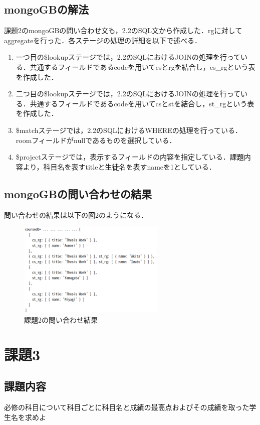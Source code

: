 \documentclass[dvipdfmx]{jarticle}
\begin{document}
\subsection{mongoGBの解法}
課題2のmongoGBの問い合わせ文も，2.2のSQL文から作成した．rgに対してaggregateを行った．各ステージの処理の詳細を以下で述べる．
\begin{enumerate}
    \item 一つ目の\$lookupステージでは，2.2のSQLにおけるJOINの処理を行っている．共通するフィールドであるcodeを用いてcsとrgを結合し，cs\_rgという表
    を作成した．
    \item 二つ目の\$lookupステージでは，2.2のSQLにおけるJOINの処理を行っている．共通するフィールドであるcodeを用いてcsとstを結合し，st\_rgという表
    を作成した．
    \item \$matchステージでは，2.2のSQLにおけるWHEREの処理を行っている．roomフィールドがnullであるものを選択している．
    \item \$projectステージでは，表示するフィールドの内容を指定している．課題内容より，科目名を表すtitleと生徒名を表すnameを1としている．
\end{enumerate}
\subsection{mongoGBの問い合わせの結果}
問い合わせの結果は以下の図2のようになる．
\begin{figure}[h]
    \centering
    \includegraphics[width=7cm]{mongo2_result.png}
    \caption{課題2の問い合わせ結果}
\end{figure}
\section{課題3}
\subsection{課題内容}
必修の科目について科目ごとに科目名と成績の最高点およびその成績を取った学生名を求めよ
\end{document}
